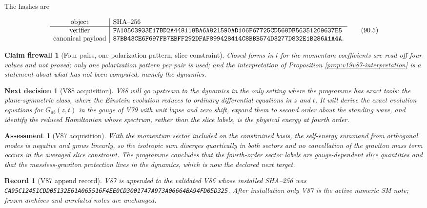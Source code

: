 \documentclass[11pt]{article}
\newtheorem{firewall}[theorem]{Claim firewall}
\newtheorem{decision}[theorem]{Next decision}
\newtheorem{assessment}[theorem]{Assessment}
\newtheorem{record}[theorem]{Record}
\theoremstyle{remark}
\begin{document}
The hashes are

\[
\begin{array}{c|l}
\hbox{object}&\hbox{SHA--256}\\ \hline
\hbox{verifier}&
\texttt{FA10503933E17BD2A448118BA6A821590AD106F67725CD568DB56351209637E5}\\
\hbox{canonical payload}&
\texttt{87BB43CE6F697FB7EBFF292DFAF899428414C8BBB574D3277D832E1B286A1A4A}.
\end{array}                                                     \tag{90.5}
\]

\begin{firewall}[Four pairs, one polarization pattern, slice constraint]
\label{fire:v19v87}
Closed forms in \(l\) for the momentum coefficients are read off four
values and not proved; only one polarization pattern per pair is
used; and the interpretation of Proposition
\ref{prop:v19v87-interpretation} is a statement about what has not
been computed, namely the dynamics.
\end{firewall}

\begin{decision}[V88 acquisition]
\label{dec:v19v87-next}
V88 will go upstream to the dynamics in the only setting where the
programme has exact tools: the plane-symmetric class, where the
Einstein evolution reduces to ordinary differential equations in
\(z\) and \(t\).  It will derive the exact evolution equations for
\(G_{ab}(z,t)\) in the gauge of V79 with unit lapse and zero shift,
expand them to second order about the standing wave, and identify the
reduced Hamiltonian whose spectrum, rather than the slice labels, is
the physical energy at fourth order.
\end{decision}

\begin{assessment}[V87 acquisition]
\label{ass:v19v87}
With the momentum sector included on the constrained basis, the
self-energy summand from orthogonal modes is negative and grows
linearly, so the isotropic sum diverges quartically in both sectors
and no cancellation of the graviton mass term occurs in the averaged
slice constraint.  The programme concludes that the fourth-order
sector labels are gauge-dependent slice quantities and that the
massless-graviton protection lives in the dynamics, which is now the
declared next target.
\end{assessment}

\begin{record}[V87 append record]
\label{rec:v19v87}
V87 is appended to the validated V86 whose installed SHA--256 was
\texttt{CA95C12451CDD05132E61A065516F4EE0CD3001747A973A06664BA94FD05D325}.
After installation only V87 is the active numeric SM note; frozen
archives and unrelated notes are unchanged.
\end{record}
\end{document}
